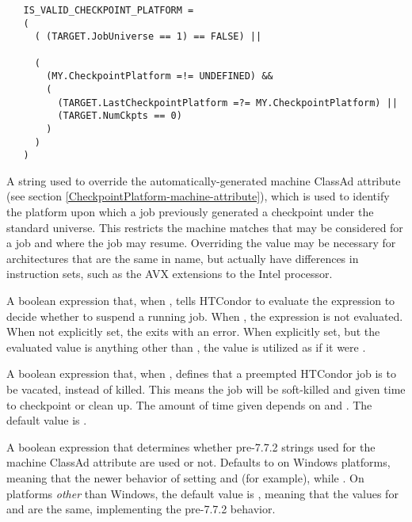 \begin{description}
   \footnotesize
   \begin{verbatim}
   IS_VALID_CHECKPOINT_PLATFORM =
   (
     ( (TARGET.JobUniverse == 1) == FALSE) ||
   
     (
       (MY.CheckpointPlatform =!= UNDEFINED) &&
       (
         (TARGET.LastCheckpointPlatform =?= MY.CheckpointPlatform) ||
         (TARGET.NumCkpts == 0)
       )
     )
   )
   \end{verbatim}
   \normalsize

\label{param:CheckpointPlatform}
\item[\Macro{CHECKPOINT\_PLATFORM}]
  A string used to
  override the automatically-generated machine ClassAd attribute 
   (see section
  \ref{CheckpointPlatform-machine-attribute}),
  which is used to identify the platform upon which a job previously generated
  a checkpoint under the standard universe.
  This restricts the machine matches that may be considered for a job
  and where the job may resume.
  Overriding the value may be necessary for architectures that are
  the same in name, but actually have differences in instruction sets,
  such as the AVX extensions to the Intel processor.

\label{param:WantSuspend}
\item[\Macro{WANT\_SUSPEND}]
  A boolean expression that, when ,
  tells HTCondor to evaluate the  expression to decide
  whether to suspend a running job.  When , the 
  expression is not evaluated.
  When not explicitly set, the  exits with an error.
  When explicitly set, but the evaluated value is anything other than
  , the value is utilized as if it were .

\label{param:WantVacate}
\item[\Macro{WANT\_VACATE}]
  A boolean expression that, when , defines that a preempted
  HTCondor job is to be vacated, instead of killed.  This means the
  job will be soft-killed and given time to checkpoint or clean up.
  The amount of time given depends on 
  and .
  The default value is .

\label{param:EnableVersionedOpsys}
\item[\Macro{ENABLE\_VERSIONED\_OPSYS}]
  A boolean expression that determines whether pre-7.7.2 strings used for
  the machine ClassAd attribute  are used or not.
  Defaults to  on Windows platforms, meaning that the newer
  behavior of setting  and 
  (for example), while .
  On platforms \emph{other} than Windows, the default value is ,
  meaning that the values for  and  are the same,
  implementing the pre-7.7.2 behavior.


\end{description}

